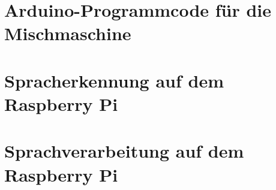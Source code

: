 \chapter{Arduino-Programmcode für die Mischmaschine}\label{Anhang_A}


\chapter{Spracherkennung auf dem Raspberry Pi}\label{Anhang_B}


\chapter{Sprachverarbeitung auf dem Raspberry Pi}\label{Anhang_C}


